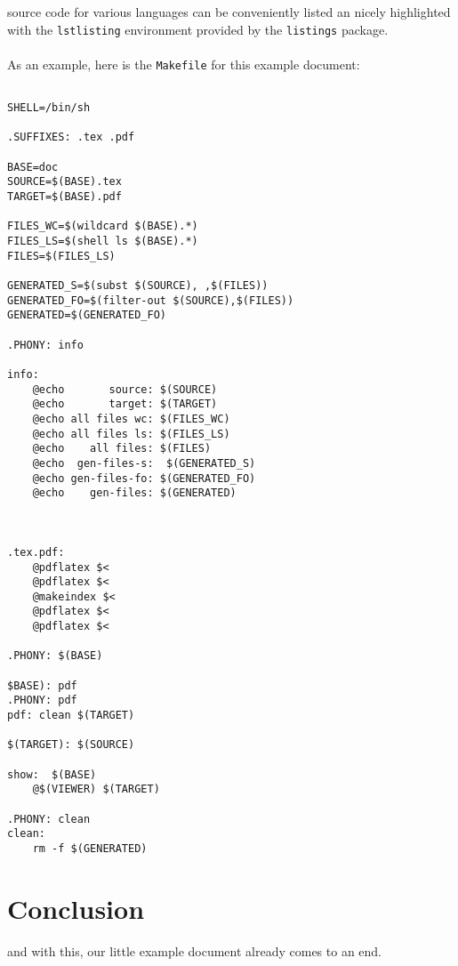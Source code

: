 \documentclass{article}
\begin{document}
source code for various languages  can be conveniently listed an nicely highlighted with the \verb+lstlisting+ environment provided by the \verb+listings+ package.


 \paragraph{} As an example, here is the \verb+Makefile+ for this example document:

\lstset{language=[gnu] make}
\begin{lstlisting}

SHELL=/bin/sh

.SUFFIXES: .tex .pdf

BASE=doc
SOURCE=$(BASE).tex
TARGET=$(BASE).pdf

FILES_WC=$(wildcard $(BASE).*)
FILES_LS=$(shell ls $(BASE).*)
FILES=$(FILES_LS)

GENERATED_S=$(subst $(SOURCE), ,$(FILES))
GENERATED_FO=$(filter-out $(SOURCE),$(FILES))
GENERATED=$(GENERATED_FO)

.PHONY: info

info:
	@echo       source: $(SOURCE)
	@echo       target: $(TARGET)
	@echo all files wc: $(FILES_WC)
	@echo all files ls: $(FILES_LS)
	@echo    all files: $(FILES)
	@echo  gen-files-s:  $(GENERATED_S)
	@echo gen-files-fo: $(GENERATED_FO)
	@echo    gen-files: $(GENERATED)



.tex.pdf:
	@pdflatex $<
	@pdflatex $<
	@makeindex $<
	@pdflatex $<
	@pdflatex $<

.PHONY: $(BASE)
	
$BASE): pdf
.PHONY: pdf
pdf: clean $(TARGET)

$(TARGET): $(SOURCE)

show:  $(BASE)
	@$(VIEWER) $(TARGET)

.PHONY: clean
clean:
	rm -f $(GENERATED)

\end{lstlisting}






\section{Conclusion}

and with this, our little example document already comes to an end.



\printindex
{}
\end{document}
